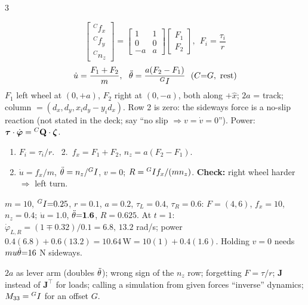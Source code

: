 \begin{multicols}{3}
\nopagebreak[4]
\begin{fbx}
\[\begin{bmatrix}{}^Cf_x\\{}^Cf_y\\{}^Cn_z\end{bmatrix}=\begin{bmatrix}1&1\\0&0\\-a&a\end{bmatrix}\begin{bmatrix}F_1\\F_2\end{bmatrix},\ \ F_i=\frac{\tau_i}{r}\]
\[\dot u=\frac{F_1+F_2}{m},\ \ \wEthh=\frac{a(F_2-F_1)}{\wEI}\ \ (C{=}G,\ \text{rest})\]
$F_1$ left wheel at $(0,+a)$, $F_2$ right at $(0,-a)$, both along $+\hat x$; $2a$ = track; column $=(d_x,d_y,x_id_y-y_id_x)$. Row 2 is zero: the sideways force is a no-slip reaction (not stated in the deck; say ``no slip $\Rightarrow v{=}\dot v{=}0$''). Power: $\boldsymbol\tau\cdot\dot{\boldsymbol\varphi}={}^{C}\mathbf Q\cdot\boldsymbol\zeta$.
\end{fbx}
\begin{recipe}
\begin{enumerate}
\item $F_i=\tau_i/r$. \ 2.\ $f_x=F_1+F_2$, $n_z=a(F_2-F_1)$.
\item $\dot u=f_x/m$, $\ddot\theta=n_z/{}^{G}I$, $v=0$; $R={}^{G}I f_x/(mn_z)$. \textbf{Check:} right wheel harder $\Rightarrow$ left turn.

\end{enumerate}
\end{recipe}
\begin{worked}[ours]
$m{=}10$, ${}^{G}I{=}0.25$, $r{=}0.1$, $a{=}0.2$, $\tau_L{=}0.4$, $\tau_R{=}0.6$: $F{=}(4,6)$, $f_x{=}10$, $n_z{=}0.4$; $\dot u{=}\mathbf{1.0}$, $\ddot\theta{=}\mathbf{1.6}$, $R{=}0.625$. At $t{=}1$: $\dot\varphi_{L,R}{=}(1\mp0.32)/0.1{=}6.8,\,13.2$ rad/s; power $0.4(6.8){+}0.6(13.2){=}10.64\,\mathrm W{=}10(1){+}0.4(1.6)$. Holding $v{=}0$ needs $mu\dot\theta{=}16$ N sideways. \chk
\end{worked}
\begin{trap}
$2a$ as lever arm (doubles $\ddot\theta$); wrong sign of the $n_z$ row; forgetting $F=\tau/r$; $\mathbf J$ instead of $\mathbf J^\top$ for loads; calling a simulation from given forces ``inverse'' dynamics; $M_{33}={}^{G}I$ for an offset $G$.
\end{trap}


\end{multicols}
